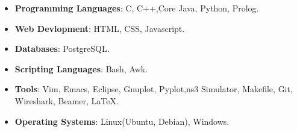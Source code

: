 \begin{multicols}{2}
\begin{itemize}
  \item \textbf{Programming Languages}: C, C++,Core Java, Python, Prolog.\\[-0.6cm]
 
  \item \textbf{Web Devlopment}: HTML, CSS, Javascript. 
  \item \textbf{Databases}: PostgreSQL.\\[-0.6cm]
\end{itemize}
\columnbreak
\begin{itemize}
 \item \textbf{Scripting Languages}: Bash, Awk. \\[-0.6cm]
  \item \textbf{Tools}: Vim, Emacs, Eclipse, Gnuplot, Pyplot,ns3 Simulator, Makefile, Git, Wireshark, Beamer, \LaTeX.\\[-0.6cm]
  \item \textbf{Operating Systems}: Linux(Ubuntu, Debian), Windows.\\[-0.6cm]
\end{itemize}
\end{multicols}

